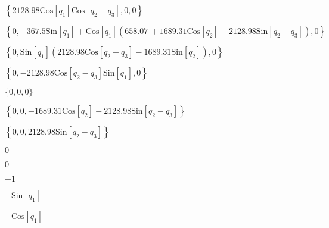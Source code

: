 \documentclass{article}
\begin{document}
\begin{doublespace}
\noindent\(\left\{2128.98 \text{Cos}\left[q_1\right] \text{Cos}\left[q_2-q_3\right],0,0\right\}\)
\end{doublespace}

\begin{doublespace}
\noindent\(\left\{0,-367.5 \text{Sin}\left[q_1\right]+\text{Cos}\left[q_1\right] \left(658.07\, +1689.31 \text{Cos}\left[q_2\right]+2128.98 \text{Sin}\left[q_2-q_3\right]\right),0\right\}\)
\end{doublespace}

\begin{doublespace}
\noindent\(\left\{0,\text{Sin}\left[q_1\right] \left(2128.98 \text{Cos}\left[q_2-q_3\right]-1689.31 \text{Sin}\left[q_2\right]\right),0\right\}\)
\end{doublespace}

\begin{doublespace}
\noindent\(\left\{0,-2128.98 \text{Cos}\left[q_2-q_3\right] \text{Sin}\left[q_1\right],0\right\}\)
\end{doublespace}

\begin{doublespace}
\noindent\(\{0,0,0\}\)
\end{doublespace}

\begin{doublespace}
\noindent\(\left\{0,0,-1689.31 \text{Cos}\left[q_2\right]-2128.98 \text{Sin}\left[q_2-q_3\right]\right\}\)
\end{doublespace}

\begin{doublespace}
\noindent\(\left\{0,0,2128.98 \text{Sin}\left[q_2-q_3\right]\right\}\)
\end{doublespace}

\begin{doublespace}
\noindent\(0\)
\end{doublespace}

\begin{doublespace}
\noindent\(0\)
\end{doublespace}

\begin{doublespace}
\noindent\(-1\)
\end{doublespace}

\begin{doublespace}
\noindent\(-\text{Sin}\left[q_1\right]\)
\end{doublespace}

\begin{doublespace}
\noindent\(-\text{Cos}\left[q_1\right]\)
\end{doublespace}
\end{document}
